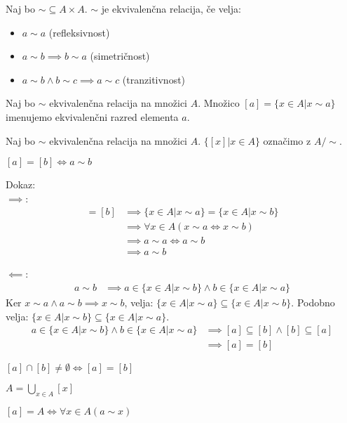 \begin{definicija}
    Naj bo $\sim \subseteq A \times A$. $\sim$ je ekvivalenčna relacija, če velja:
    \begin{itemize}
        \item $a\sim a$ (refleksivnost)
        \item $a\sim b \implies b\sim a$ (simetričnost)
        \item $a\sim b \wedge b\sim c \implies a\sim c$ (tranzitivnost)
    \end{itemize}
\end{definicija}

\begin{definicija}
    Naj bo $\sim$ ekvivalenčna relacija na množici $A$.
    Množico $[a] = \{x \in A | x \sim a\}$ imenujemo ekvivalenčni razred elementa $a$.
\end{definicija}

\begin{definicija}
    Naj bo $\sim$ ekvivalenčna relacija na množici $A$.
    $\{[x] | x \in A\}$ označimo z $A/\sim$.
\end{definicija}

\begin{trditev}
    $[a] = [b] \iff a\sim b$
\end{trditev}
Dokaz:\\
$\implies$:
\begin{align*}
    [a] = [b] &\implies \{x \in A | x \sim a\} = \{x \in A | x \sim b\} \\
    &\implies \forall x \in A(x \sim a \iff x \sim b) \\
    &\implies a \sim a \iff a \sim b \\
    &\implies a\sim b
\end{align*}

$\impliedby$:
\begin{align*}
    a\sim b &\implies a \in \{x \in A | x \sim b\} \wedge b \in \{x \in A | x \sim a\}
\end{align*}
Ker $x \sim a \wedge a \sim b \implies x \sim b$, velja: $\{x \in A | x \sim a\} \subseteq \{x \in A | x \sim b\}$.
Podobno velja: $\{x \in A | x \sim b\} \subseteq \{x \in A | x \sim a\}$.
\begin{align*}
    a \in \{x \in A | x \sim b\} \wedge b \in \{x \in A | x \sim a\} &\implies [a] \subseteq [b] \wedge [b] \subseteq [a] \\
    &\implies [a] = [b]
\end{align*}

\begin{trditev}
    $[a] \cap [b] \neq \emptyset \iff [a] = [b]$
\end{trditev}

\begin{trditev}
    $A = \bigcup_{x \in A} [x]$
\end{trditev}

\begin{trditev}
    $[a] = A \iff \forall x \in A(a\sim x)$
\end{trditev}


